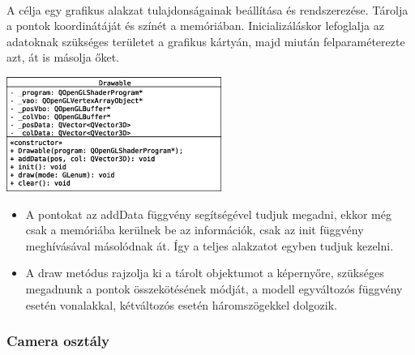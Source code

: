 \documentclass[12pt]{report}
\begin{document}
\paragraph{}
A célja egy grafikus alakzat tulajdonságainak beállítása és rendszerezése. Tárolja a pontok koordinátáját és színét a memóriában. Inicializáláskor lefoglalja az adatoknak szükséges területet a grafikus kártyán, majd miután felparaméterezte azt, át is másolja őket.
\begin{center}
\includegraphics[width=7cm]{pics/uml/Drawable}
\end{center}
\begin{itemize}
\item A pontokat az addData függvény segítségével tudjuk megadni, ekkor még csak a memóriába kerülnek be az információk, csak az init függvény meghívásával másolódnak át. Így a teljes alakzatot egyben tudjuk kezelni.
\item A draw metódus rajzolja ki a tárolt objektumot a képernyőre, szükséges megadnunk a pontok összekötésének módját, a modell egyváltozós függvény esetén vonalakkal, kétváltozós esetén háromszögekkel dolgozik.
\end{itemize}

\subsubsection{Camera osztály}
\end{document}
